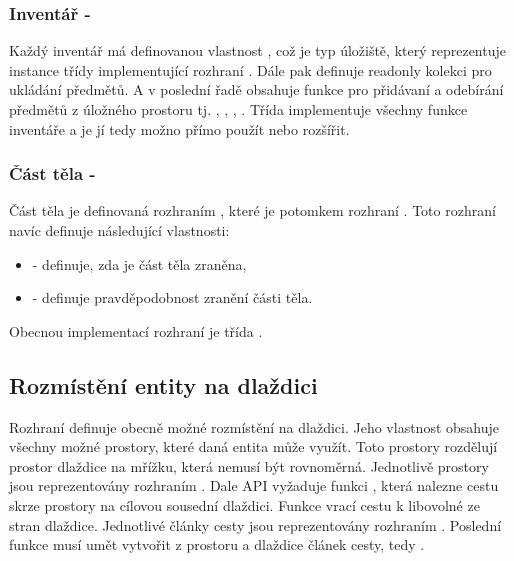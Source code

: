 \subsubsection{Inventář - }
Každý inventář má definovanou vlastnost , což je typ úložiště, který reprezentuje instance třídy 
implementující rozhraní . Dále pak definuje readonly kolekci  pro ukládání předmětů.
A v poslední řadě obsahuje funkce pro přidávaní a odebírání předmětů z úložného prostoru tj. , , ,
. Třída  implementuje všechny funkce inventáře a je jí tedy možno přímo použít nebo rozšířit.

\subsubsection{Část těla - }
Část těla je definovaná rozhraním , které je potomkem rozhraní . Toto rozhraní navíc definuje 
následující vlastnosti: 
\begin{itemize}
\item {} - definuje, zda je část těla zraněna,
\item {} - definuje pravděpodobnost zranění části těla.
\end{itemize}

Obecnou implementací rozhraní je třída . 

\subsection{Rozmístění entity na dlaždici}\label{layout-manager-section}

Rozhraní  definuje obecně možné rozmístění na dlaždici. Jeho vlastnost  obsahuje všechny možné prostory, které daná entita může využít.
Toto prostory rozdělují prostor dlaždice na mřížku, která nemusí být rovnoměrná.
Jednotlivě prostory jsou reprezentovány rozhraním . Dale API vyžaduje funkci , která nalezne cestu skrze prostory
na cílovou sousední dlaždici. Funkce  vrací cestu k libovolné ze stran dlaždice. Jednotlivé články cesty jsou 
reprezentovány rozhraním . Poslední funkce musí umět vytvořit z prostoru a dlaždice článek cesty,
tedy .  

